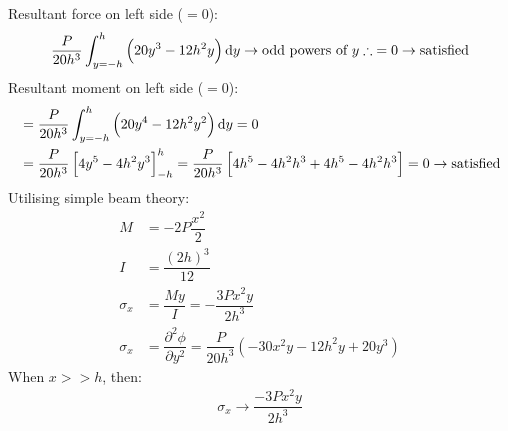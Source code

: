 Resultant force on left side ($= 0$):
\begin{align}
    \dfrac{P}{20h^3}\int_{y=-h}^h \left(20y^3 - 12h^2 y\right)\dif y \rightarrow \textrm{odd powers of } y \therefore\; = 0 \rightarrow \textrm{satisfied}
\end{align}
Resultant moment on left side ($= 0$):
\begin{align}
     & = \dfrac{P}{20h^3}\int_{y=-h}^h \left(20y^4 - 12h^2 y^2\right)\dif y = 0                                                                             \\
     & = \dfrac{P}{20h^3}\left[4y^5-4h^2y^3\right]_{-h}^h = \dfrac{P}{20h^3}\left[4h^5 - 4h^2h^3 + 4h^5 - 4h^2h^3\right] = 0 \rightarrow \textrm{satisfied}
\end{align}
Utilising simple beam theory:
\begin{align}
    M        & = - 2P\dfrac{x^2}{2}                                                                          \\
    I        & = \dfrac{\left(2h\right)^3}{12}                                                               \\
    \sigma_x & = \dfrac{My}{I} = -\dfrac{3Px^2y}{2h^3}                                                       \\
    \sigma_x & = \dfrac{\partial^2 \phi}{\partial y^2} = \dfrac{P}{20h^3}\left(-30x^2 y -12h^2y+20y^3\right)
\end{align}
When $x>>h$, then:
\begin{gather}
    \sigma_x \rightarrow \dfrac{-3Px^2y}{2h^3}
\end{gather}
